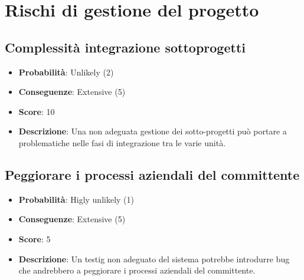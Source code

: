 \documentclass{article}
\begin{document}
  \section{Rischi di gestione del progetto}

  \subsection{Complessità integrazione sottoprogetti}
  \begin{itemize}
    \item \textbf{Probabilità}: Unlikely (2)
    \item \textbf{Conseguenze}: Extensive (5)
    \item \textbf{Score}: 10
    \item \textbf{Descrizione}: Una non adeguata gestione dei sotto-progetti 
        può portare a problematiche nelle fasi di integrazione tra le varie unità.
  \end{itemize}

  \subsection{Peggiorare i processi aziendali del committente}
  \begin{itemize}
    \item \textbf{Probabilità}: Higly unlikely (1)
    \item \textbf{Conseguenze}: Extensive (5)
    \item \textbf{Score}: 5
    \item \textbf{Descrizione}: Un testig non adeguato del sistema potrebbe introdurre bug 
        che andrebbero a peggiorare i processi aziendali del committente.
  \end{itemize}
\end{document}
